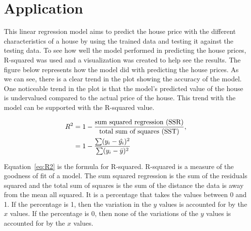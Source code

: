 \documentclass[12pt]{article}
\begin{document}
\section{Application}
\label{sec:app}


This linear regression model aims to predict the house price with the different characteristics of a house by using the trained data and testing it against the testing data. To see how well the model performed in predicting the house prices, R-squared was used and a visualization was created to help see the results. The figure below represents how the model did with predicting the house prices. As we can see, there is a clear trend in the plot showing the accuracy of the model. One noticeable trend in the plot is that the model's predicted value of the house is undervalued compared to the actual price of the house. This trend with the model can be supported with the R-squared value.

\begin{align}
\label{eq:R2}
\begin{split}
    R^2 &= 1 - \frac{\text{sum squared regression (SSR)}}{\text{total sum of squares (SST)}}, \\
    &= 1-\frac{\sum(y_i - \hat{y_i})^2 }{\sum(y_i - \Bar{y})^2} 
\end{split}
\end{align}

Equation~\ref{eq:R2} is the formula for R-squared. R-squared is a measure of the goodness of fit of a model. The sum squared regression is the sum of the residuals squared and the total sum of squares is the sum of the distance the data is away from the mean all squared. It is a percentage that takes the values between 0 and 1. If the percentage is 1, then the variation in the \(y\) values is accounted for by the \(x\) values. If the percentage is 0, then none of the variations of the \(y\) values is accounted for by the \(x\) values. \cite{kasuya2018}
\end{document}
